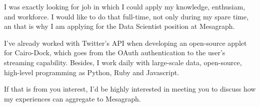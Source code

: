 I was exactly looking for job in which I could apply my knowledge, enthusiam, and workforce. I would like to do that full-time, not only during my spare time, an that is why I am applying for the Data Scientist position at Mesagraph. 

I've already worked with Twitter's API when developing an open-source applet for Cairo-Dock, which goes from the OAuth authentication to the user's streaming capability. Besides, I work daily with large-scale data, open-source, high-level programming as Python, Ruby and Javascript.

If that is from you interest, I'd be highly interested in meeting you to discuss how my experiences can aggregate to Mesagraph.

\makeletterclosing